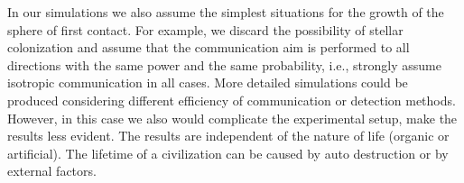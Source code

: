 \documentclass[crop]{CSLB}
\begin{document}
In our simulations we also assume the simplest situations for the
growth of the sphere of first contact.
%
For example, we discard the possibility of stellar colonization
\citep[e.g.][]{newman_galactic_1981, walters_interstellar_1980,
starling_virulence_2013, barlow_galactic_2012, jeong_large_2000,
maccone_mathematical_2011} and assume that the communication aim is
performed to all directions with the same power and the same
probability, i.e., strongly assume isotropic communication in all
cases.
%
More detailed simulations could be produced considering different
efficiency of communication or detection methods.
%
However, in this case we also would complicate the experimental setup,
make the results less evident.
%
The results are independent of the nature of life (organic or
artificial).
%
The lifetime of a civilization can be caused by auto destruction or by
external factors.
\end{document}
